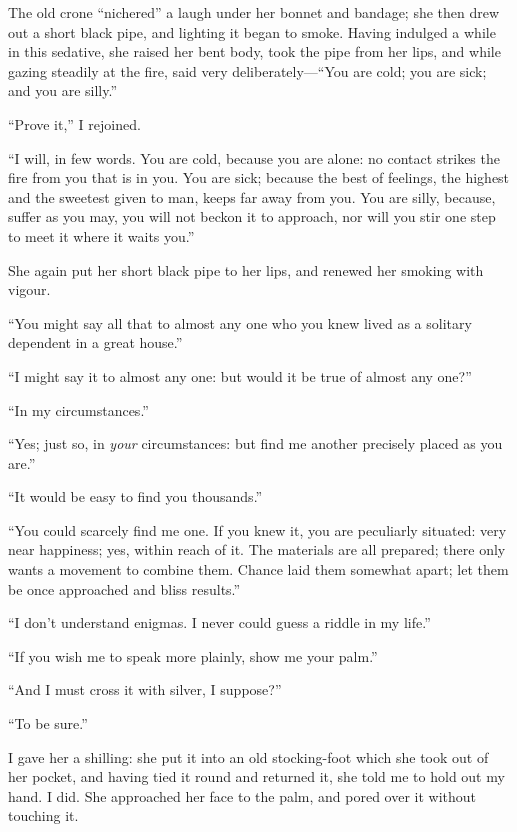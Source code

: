 The old crone \enquote{nichered} a laugh under her bonnet and bandage;
she then drew out a short black pipe, and lighting it began to smoke. 
Having indulged a while in this sedative, she raised her bent body, took
the pipe from her lips, and while gazing steadily at the fire, said very
deliberately---\enquote{You are cold; you are sick; and you are silly.}

\enquote{Prove it,} I rejoined.

\enquote{I will, in few words. You are cold, because you are alone: no
contact strikes the fire from you that is in you. You are sick; because
the best of feelings, the highest and the sweetest given to man, keeps
far away from you. You are silly, because, suffer as you may, you will
not beckon it to approach, nor will you stir one step to meet it where
it waits you.}

She again put her short black pipe to her lips, and renewed her smoking
with vigour.

\enquote{You might say all that to almost any one who you knew lived as
a solitary dependent in a great house.}

\enquote{I might say it to almost any one: but would it be true of
almost any one?}

\enquote{In my circumstances.}

\enquote{Yes; just so, in \emph{your} circumstances: but find me another
precisely placed as you are.}

\enquote{It would be easy to find you thousands.}

\enquote{You could scarcely find me one. If you knew it, you are
peculiarly situated: very near happiness; yes, within reach of it. The
materials are all prepared; there only wants a movement to combine
them. Chance laid them somewhat apart; let them be once approached and
bliss results.}

\enquote{I don't understand enigmas. I never could guess a riddle in my
life.}

\enquote{If you wish me to speak more plainly, show me your palm.}

\enquote{And I must cross it with silver, I suppose?}

\enquote{To be sure.}

I gave her a shilling: she put it into an old stocking-foot which she
took out of her pocket, and having tied it round and returned it, she
told me to hold out my hand. I did. She approached her face to the
palm, and pored over it without touching it.

